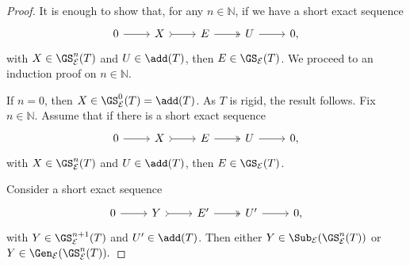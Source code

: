 \begin{proof}
It is enough to show that, for any $n \in \mathbb{N}$, if we have a short exact sequence \[\begin{tikzcd}
	    0 & X & E  & U &  0,
	\arrow[from=1-1, to=1-2]
	\arrow[tail, from=1-2, to=1-3]
	\arrow[two heads,from=1-3, to=1-4]
	\arrow[from=1-4, to=1-5]
\end{tikzcd} \] with $X\in \GS^n_{\mathcal{E}}(T)$ and $U \in \add(T)$, then $E \in  \GS_{\mathcal{E}}(T)$. We proceed to an induction proof on $n \in \mathbb{N}$. 

If $n=0$, then $X \in \GS^0_{\mathcal{E}}(T) = \add(T)$. As $T$ is rigid, the result follows. Fix $n \in \mathbb{N}$. Assume that if there is a short exact sequence \[\begin{tikzcd}
	0 & X & E  & U &  0,
	\arrow[from=1-1, to=1-2]
	\arrow[tail, from=1-2, to=1-3]
	\arrow[two heads,from=1-3, to=1-4]
	\arrow[from=1-4, to=1-5]
\end{tikzcd} \] with $X \in \GS^{n}_{\mathcal{E}}(T)$ and $U \in \add(T)$, then $E \in \GS_{\mathcal{E}}(T)$.

Consider a short exact sequence \[\begin{tikzcd}
	0 & Y & E'  & U' &  0,
	\arrow[from=1-1, to=1-2]
	\arrow[tail, from=1-2, to=1-3]
	\arrow[two heads,from=1-3, to=1-4]
	\arrow[from=1-4, to=1-5]
\end{tikzcd} \] with $Y \in \GS^{n+1}_{\mathcal{E}}(T)$ and $U' \in \add(T)$. Then either $Y \in \Sub_\mathcal{E}(\GS^{n}_{\mathcal{E}}(T))$ or $Y \in \Gen_\mathcal{E}(\GS^{n}_{\mathcal{E}}(T)).$


\end{proof}
